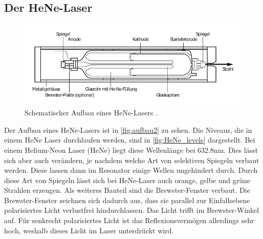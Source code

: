 \subsection{Der HeNe-Laser}
\begin{figure}
    \centering
    \includegraphics[width = 0.7 \linewidth]{pictures/aufbau2.pdf}
    \caption{Schematischer Aufbau eines HeNe-Lasers \cite{laseraufbau}.}
    \label{fig:aufbau2}
\end{figure}
Der Aufbau eines HeNe-Lasers ist in \autoref{fig:aufbau2} zu sehen.
Die Niveaus, die in einem HeNe Laser durchlaufen werden, sind in \autoref{fig:HeNe_levels} dargestellt.
Bei einem Helium-Neon Laser (HeNe) liegt diese Wellenlänge bei $632.8 \unit{\nano\meter}$.
Dies lässt sich aber auch verändern, je nachdem welche Art von selektiven Spiegeln verbaut werden.
Diese lassen dann im Resonator einige Wellen ungehindert durch.
Durch diese Art von Spiegeln lässt sich bei HeNe-Laser auch orange, gelbe und grüne Strahlen erzeugen. 
Als weiteres Bauteil sind die Brewster-Fenster verbaut.
Die Brewster-Fenster zeichnen sich dadurch aus, dass sie parallel zur Einfallsebene polarisiertes Licht verlustfrei hindurchlassen.
Das Licht trifft im Brewster-Winkel auf.
Für senkrecht polarisiertes Licht ist das Reflexionsvermögen allerdings sehr hoch, weshalb dieses Licht im Laser unterdrückt wird.